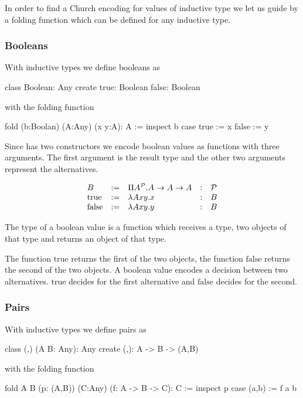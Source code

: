 In order to find a Church encoding for values of inductive type we let us
guide by a folding function which can be defined for any inductive type.



\subsubsection{Booleans}

With inductive types we define booleans as
\begin{alba}
  class Boolean: Any create
    true:  Boolean
    false: Boolean
\end{alba}
%
with the folding function
%
\begin{alba}
  fold (b:Boolan) (A:Any) (x y:A): A :=
    inspect b case
      true :=
         x
      false :=
         y
\end{alba}


Since  has two constructors we encode boolean values as
functions with three arguments. The first argument is the result type and the
other two arguments represent the alternatives.

$$
\begin{array}{lllll}
  B & :=
  & \Pi A^{\cal{P}} . A \to A \to A
  &:
  & {\cal{P}}
  \\
  \text{true} &:=
  & \lambda A x y . x
  &: & B
  \\
  \text{false} &:=
  & \lambda A x y . y
  &: & B
\end{array}
$$

The type of a boolean value is a function which receives a type, two objects
of that type and returns an object of that type.

The function $\text{true}$ returns the first of the two objects, the function
$\text{false}$ returns the second of the two objects. A boolean value encodes
a decision between two alternatives.  $\text{true}$ decides for the first
alternative and $\text{false}$ decides for the second.



\subsubsection{Pairs}

With inductive types we define pairs as
\begin{alba}
  class (,) (A B: Any): Any create
    (,): A -> B -> (A,B)
\end{alba}
%
with the folding function
%
\begin{alba}
  fold A B (p: (A,B)) (C:Any) (f: A -> B -> C): C :=
    inspect p case
      (a,b) :=
         f a b
\end{alba}

